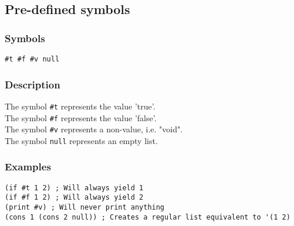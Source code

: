 \subsection{Pre-defined symbols}
\label{builtins/predefined-symbols}

\subsubsection*{Symbols}
\begin{lstlisting}
#t #f #v null
\end{lstlisting}

\subsubsection*{Description}
The symbol \lstinline|#t| represents the value 'true'.\\
The symbol \lstinline|#f| represents the value 'false'.\\
The symbol \lstinline|#v| represents a non-value, i.e. "void".\\
The symbol \lstinline|null| represents an empty list.

\subsubsection*{Examples}
\begin{lstlisting}
(if #t 1 2) ; Will always yield 1
(if #f 1 2) ; Will always yield 2
(print #v) ; Will never print anything
(cons 1 (cons 2 null)) ; Creates a regular list equivalent to '(1 2)
\end{lstlisting}
